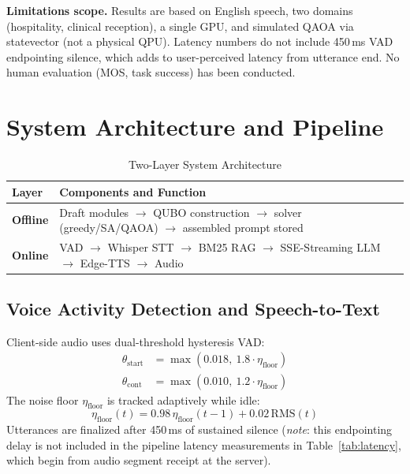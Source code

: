 \documentclass[journal]{IEEEtran}
\begin{document}
\textbf{Limitations scope.} Results are based on English speech, two domains
(hospitality, clinical reception), a single GPU, and simulated QAOA via
statevector (not a physical QPU). Latency numbers do not include 450\,ms VAD
endpointing silence, which adds to user-perceived latency from utterance end.
No human evaluation (MOS, task success) has been conducted.

\section{System Architecture and Pipeline}

\begin{table}[!h]
\caption{Two-Layer System Architecture}
\label{tab:architecture}
\centering
\scriptsize
\setlength{\tabcolsep}{3pt}
\begin{tabularx}{\columnwidth}{L L}
\toprule
\textbf{Layer} & \textbf{Components and Function} \\
\midrule
\textbf{Offline} & Draft modules $\rightarrow$ QUBO construction $\rightarrow$
solver (greedy/SA/QAOA) $\rightarrow$ assembled prompt stored \\
\addlinespace
\textbf{Online} & VAD $\rightarrow$ Whisper STT $\rightarrow$ BM25 RAG
$\rightarrow$ SSE-Streaming LLM $\rightarrow$ Edge-TTS $\rightarrow$ Audio \\
\bottomrule
\end{tabularx}
\end{table}

\subsection{Voice Activity Detection and Speech-to-Text}

Client-side audio uses dual-threshold hysteresis VAD:
\begin{align}
\theta_{\text{start}} &= \max(0.018,\ 1.8 \cdot \eta_{\text{floor}}) \\
\theta_{\text{cont}}  &= \max(0.010,\ 1.2 \cdot \eta_{\text{floor}})
\end{align}
The noise floor $\eta_{\text{floor}}$ is tracked adaptively while idle:
\begin{equation}
\eta_{\text{floor}}(t) = 0.98\,\eta_{\text{floor}}(t{-}1) + 0.02\,\text{RMS}(t)
\end{equation}
Utterances are finalized after 450\,ms of sustained silence
(\emph{note}: this endpointing delay is not included in the pipeline
latency measurements in Table~\ref{tab:latency}, which begin from audio
segment receipt at the server).
\end{document}
